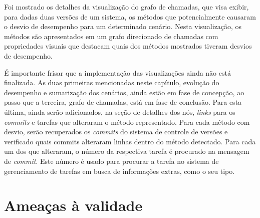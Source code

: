 Foi mostrado os detalhes da visualização do grafo de chamadas, que visa exibir, para dadas duas versões de um sistema, os métodos que potencialmente causaram o desvio de desempenho para um determinado cenário. Nesta visualização, os métodos são apresentados em um grafo direcionado de chamadas com propriedades visuais que destacam quais dos métodos mostrados tiveram desvios de desempenho.

É importante frisar que a implementação das visualizações ainda não está finalizada. As duas primeiras mencionadas neste capítulo, evolução do desempenho e sumarização dos cenários, ainda estão em fase de concepção, ao passo que a terceira, grafo de chamadas, está em fase de conclusão. Para esta última, ainda serão adicionados, na seção de detalhes dos nós, \textit{links} para os \textit{commits} e tarefas que alteraram o método representado. Para cada método com desvio, serão recuperados os \textit{commits} do sistema de controle de versões e verificado quais commits alteraram linhas dentro do método detectado. Para cada um dos que alteraram, o número da respectiva tarefa é procurado na mensagem de \textit{commit}. Este número é usado para procurar a tarefa no sistema de gerenciamento de tarefas em busca de informações extras, como o seu tipo.

\section{Ameaças à validade} \label{sec:ameacas}
